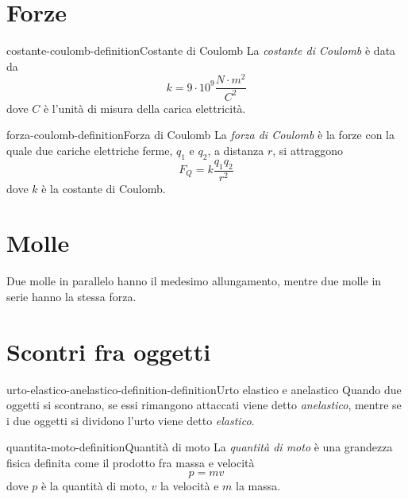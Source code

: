 \documentclass[preview]{standalone}
\begin{document}
\genpage

\section{Forze}

\begin{snippetdefinition}{costante-coulomb-definition}{Costante di Coulomb}
    La \textit{costante di Coulomb} è data da
    \[
        k = 9 \cdot 10^9 \frac{N \cdot m^2}{C^2} 
    \]
    dove \(C\) è l'unità di misura della carica elettricità.
\end{snippetdefinition}

\begin{snippetdefinition}{forza-coulomb-definition}{Forza di Coulomb}
    La \textit{forza di Coulomb} è la forze con la quale due cariche elettriche ferme,
    \(q_1\) e \(q_2\), a distanza \(r\), si attraggono
    \[
        F_Q = k \frac{q_1 q_2}{r^2}
    \]
    dove \(k\) è la costante di Coulomb.
\end{snippetdefinition}

\section{Molle}

\begin{plainhtml}
    Due molle in parallelo hanno il medesimo allungamento,
    mentre due molle in serie hanno la stessa forza.
\end{plainhtml}


\section{Scontri fra oggetti}

\begin{snippetdefinition}{urto-elastico-anelastico-definition-definition}{Urto elastico e anelastico}
    Quando due oggetti si scontrano, se essi rimangono
    attaccati viene detto \textit{anelastico}, mentre se i due oggetti
    si dividono l'urto viene detto \textit{elastico}.
\end{snippetdefinition}

\begin{snippetdefinition}{quantita-moto-definition}{Quantità di moto}
    La \textit{quantità di moto} è una grandezza fisica definita come il prodotto fra
    massa e velocità
    \[
        p = mv
    \]
    dove \(p\) è la quantità di moto, \(v\) la velocità e \(m\) la massa.
\end{snippetdefinition}
\end{document}
